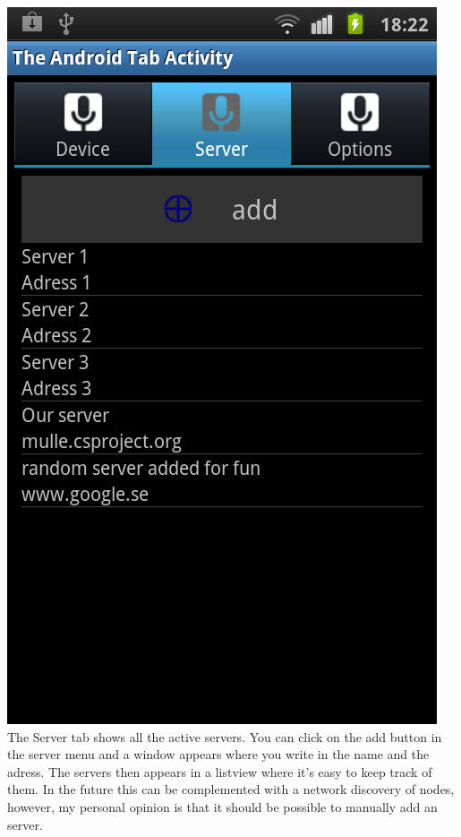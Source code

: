  \includegraphics[scale=0.50]{android-server.png}%
\\The Server tab shows all the active servers. You can click on the add button in the server menu and a window appears where you write in the name and the adress. The servers then appears in a listview where it's easy to keep track of them.
In the future this can be complemented with a network discovery of nodes, however, my personal opinion is that it should be possible to manually add an server.

